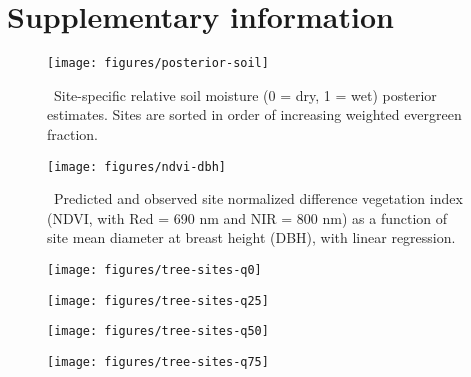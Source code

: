 \section{Supplementary information}

\begin{figure}[ht]
  \centering
  \texttt{[image: figures/posterior-soil]}
  \caption{\label{fig:posterior-soil}\
    Site-specific relative soil moisture (0 = dry, 1 = wet) posterior estimates.
    Sites are sorted in order of increasing weighted evergreen fraction.
  }
\end{figure}

\clearpage

\begin{figure}[ht]
  \centering
  \texttt{[image: figures/ndvi-dbh]}
  \caption{\label{fig:ndvi-dbh}\
    Predicted and observed site normalized difference vegetation index (NDVI, with Red = 690 nm and NIR = 800 nm)
    as a function of site mean diameter at breast height (DBH), with linear regression.
  }
\end{figure}

\clearpage

\begin{figure}[ht]
  \centering
  \texttt{[image: figures/tree-sites-q0]}
  \caption{\label{fig:tree-sites-q0} }
\end{figure}

\clearpage

\begin{figure}[ht]
  \centering
  \texttt{[image: figures/tree-sites-q25]}
  \caption{\label{fig:tree-sites-q25} }
\end{figure}

\clearpage

\begin{figure}[ht]
  \centering
  \texttt{[image: figures/tree-sites-q50]}
  \caption{\label{fig:tree-sites-q50} }
\end{figure}

\clearpage

\begin{figure}[ht]
  \centering
  \texttt{[image: figures/tree-sites-q75]}
  \caption{\label{fig:tree-sites-q75} }
\end{figure}

